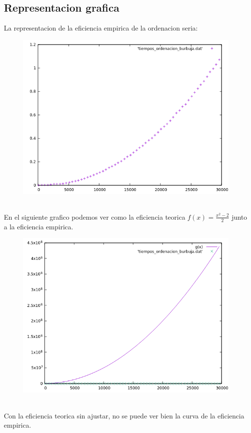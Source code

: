 \documentclass[12pt,a4psprt]{article}
\begin{document}
\subsection{Representacion grafica}
La representacion de la eficiencia empirica de la ordenacion seria:
\begin{figure}[h]
\begin{center}
	\includegraphics[scale=1]{image/grafica_1_sin_funcion.png}
\end{center}
\end{figure}
\\
En el siguiente grafico podemos ver como la eficiencia teorica
$f(x)=\frac{x^{2}-2}{2}$ junto a la eficiencia empirica.
\begin{figure}[h]
\begin{center}
	\includegraphics[scale=1]{image/grafica_1.png}
\end{center}
\end{figure}
\\
Con la eficiencia teorica sin ajustar, no se puede ver bien la curva de la eficiencia empirica.
\pagebreak
\end{document}
